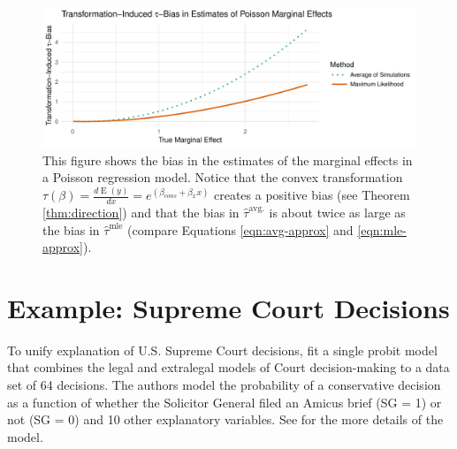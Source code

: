 \documentclass[10pt]{article}
\DeclareMathOperator*{\E}{\text{E}}
\begin{document}
\begin{figure}[h!]
\begin{center}
\includegraphics[scale = 0.6]{figs/poisson-mcs.pdf}
\caption{This figure shows the bias in the estimates of the marginal effects in a Poisson regression model. Notice that the convex transformation $\tau(\beta) = \frac{d \E (y)}{dx} = e^{(\beta_{cons} + \beta_x x)}$ creates a positive bias (see Theorem \ref{thm:direction}) and that the bias in $\hat{\tau}^\text{avg.}$ is about twice as large as the bias in $\hat{\tau}^\text{mle}$ (compare Equations \ref{eqn:avg-approx} and \ref{eqn:mle-approx}).}\label{fig:poisson-mcs}
\end{center}
\end{figure}

%
%

\section*{Example: Supreme Court Decisions}

To unify explanation of U.S. Supreme Court decisions, \cite{GeorgeEpstein1992} fit a single probit model that combines the legal and extralegal models of Court decision-making to a data set of 64 decisions. 
The authors model the probability of a conservative decision as a function of whether the Solicitor General filed an Amicus brief (SG = 1) or not (SG = 0) and 10 other explanatory variables. 
See \cite{GeorgeEpstein1992} for the more details of the model.
\end{document}
